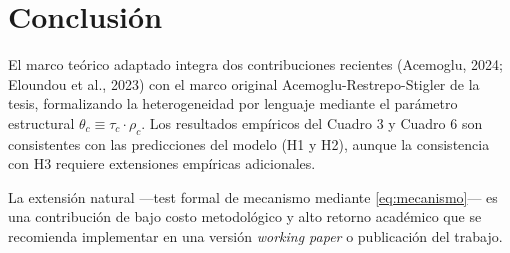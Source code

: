 \documentclass[11pt,a4paper]{article}
\theoremstyle{definition}
\begin{document}
\section{Conclusión}

El marco teórico adaptado integra dos contribuciones recientes (Acemoglu, 2024; Eloundou et al., 2023) con el marco original Acemoglu-Restrepo-Stigler de la tesis, formalizando la heterogeneidad por lenguaje mediante el parámetro estructural $\theta_c \equiv \tau_c \cdot \rho_c$. Los resultados empíricos del Cuadro 3 y Cuadro 6 son consistentes con las predicciones del modelo (H1 y H2), aunque la consistencia con H3 requiere extensiones empíricas adicionales.

La extensión natural ---test formal de mecanismo mediante \eqref{eq:mecanismo}--- es una contribución de bajo costo metodológico y alto retorno académico que se recomienda implementar en una versión \textit{working paper} o publicación del trabajo.

\clearpage
\end{document}
